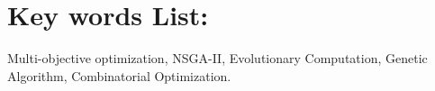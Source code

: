 %
%

\section*{Key words List:}

Multi-objective optimization, NSGA-II, Evolutionary Computation, Genetic Algorithm, Combinatorial Optimization.

